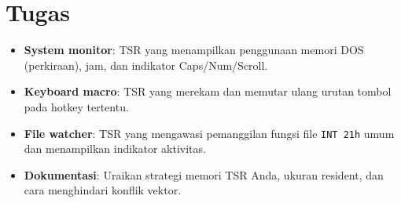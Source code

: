 \section{Tugas}
\begin{itemize}
  \item \textbf{System monitor}: TSR yang menampilkan penggunaan memori DOS (perkiraan), jam, dan indikator Caps/Num/Scroll.
  \item \textbf{Keyboard macro}: TSR yang merekam dan memutar ulang urutan tombol pada hotkey tertentu.
  \item \textbf{File watcher}: TSR yang mengawasi pemanggilan fungsi file \texttt{INT 21h} umum dan menampilkan indikator aktivitas.
  \item \textbf{Dokumentasi}: Uraikan strategi memori TSR Anda, ukuran resident, dan cara menghindari konflik vektor.
\end{itemize}

